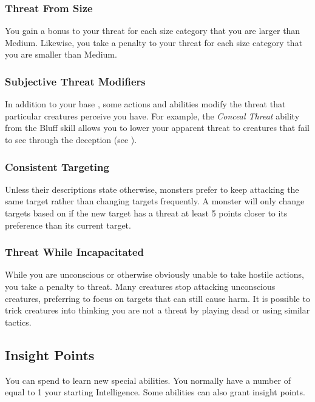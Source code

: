         \subsubsection{Threat From Size}
            You gain a  bonus to your threat for each size category that you are larger than Medium.
            Likewise, you take a  penalty to your threat for each size category that you are smaller than Medium.

        \subsubsection{Subjective Threat Modifiers}
            In addition to your base , some actions and abilities modify the threat that particular creatures perceive you have.
            For example, the \textit{Conceal Threat} ability from the Bluff skill allows you to lower your apparent threat to creatures that fail to see through the deception (see ).

        \subsubsection{Consistent Targeting}
            Unless their descriptions state otherwise, monsters prefer to keep attacking the same target rather than changing targets frequently.
            A monster will only change targets based on  if the new target has a threat at least 5 points closer to its preference than its current target.

        \subsubsection{Threat While Incapacitated}
            While you are unconscious or otherwise obviously unable to take hostile actions, you take a  penalty to threat.
            Many creatures stop attacking unconscious creatures, preferring to focus on targets that can still cause harm.
            It is possible to trick creatures into thinking you are not a threat by playing dead or using similar tactics.

    \subsection{Insight Points}\label{Insight Points}
        You can spend  to learn new special abilities.
        You normally have a number of  equal to 1 \add your starting Intelligence.
        Some abilities can also grant insight points.

